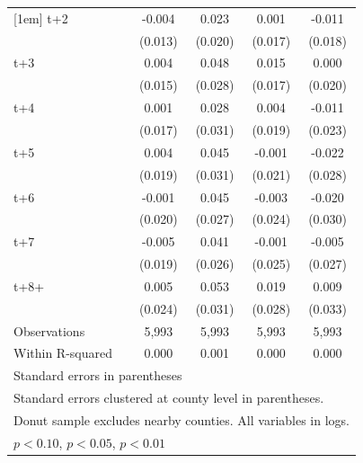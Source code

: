 \begin{table}[htbp]
\begin{tabular}{l*{4}{c}}
[1em]
t+2         &      -0.004         &       0.023         &       0.001         &      -0.011         \\
            &     (0.013)         &     (0.020)         &     (0.017)         &     (0.018)         \\
[1em]
t+3         &       0.004         &       0.048\sym{*}  &       0.015         &       0.000         \\
            &     (0.015)         &     (0.028)         &     (0.017)         &     (0.020)         \\
[1em]
t+4         &       0.001         &       0.028         &       0.004         &      -0.011         \\
            &     (0.017)         &     (0.031)         &     (0.019)         &     (0.023)         \\
[1em]
t+5         &       0.004         &       0.045         &      -0.001         &      -0.022         \\
            &     (0.019)         &     (0.031)         &     (0.021)         &     (0.028)         \\
[1em]
t+6         &      -0.001         &       0.045\sym{*}  &      -0.003         &      -0.020         \\
            &     (0.020)         &     (0.027)         &     (0.024)         &     (0.030)         \\
[1em]
t+7         &      -0.005         &       0.041         &      -0.001         &      -0.005         \\
            &     (0.019)         &     (0.026)         &     (0.025)         &     (0.027)         \\
[1em]
t+8+        &       0.005         &       0.053\sym{*}  &       0.019         &       0.009         \\
            &     (0.024)         &     (0.031)         &     (0.028)         &     (0.033)         \\
\hline
Observations&       5,993         &       5,993         &       5,993         &       5,993         \\
Within R-squared&       0.000         &       0.001         &       0.000         &       0.000         \\
\hline\hline
\multicolumn{5}{l}{\footnotesize Standard errors in parentheses}\\
\multicolumn{5}{l}{\footnotesize Standard errors clustered at county level in parentheses.}\\
\multicolumn{5}{l}{\footnotesize Donut sample excludes nearby counties. All variables in logs.}\\
\multicolumn{5}{l}{\footnotesize \sym{*} \(p<0.10\), \sym{**} \(p<0.05\), \sym{***} \(p<0.01\)}\\
\end{tabular}
\end{table}
